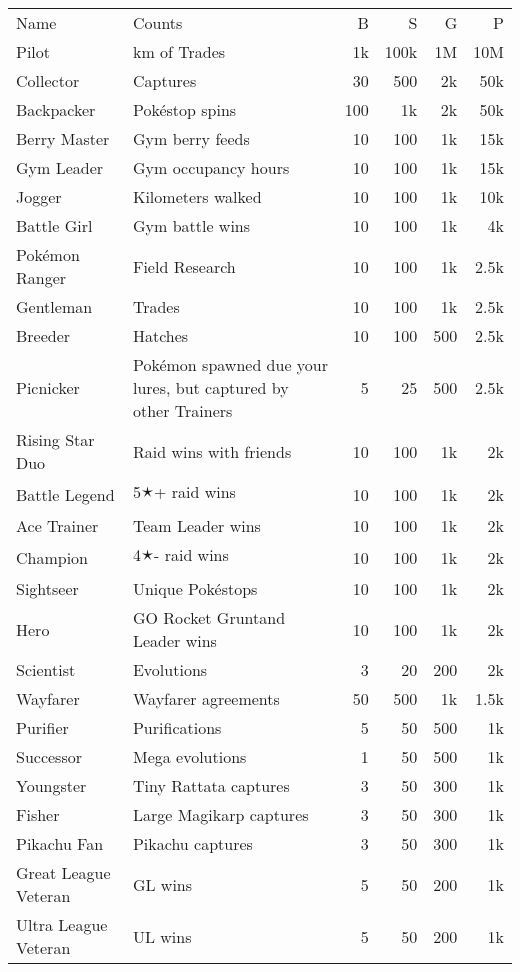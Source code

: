 \begin{longtable}{m{}m{}rrrr}
Name & Counts & B & S & G & P\\
\Midrule\endhead
Pilot & km of Trades & 1k & 100k & 1M & 10M\\
Collector & Captures & 30 & 500 & 2k & 50k\\
Backpacker & Pokéstop spins & 100 & 1k & 2k & 50k\\
Berry Master & Gym berry feeds & 10 & 100 & 1k & 15k\\
Gym Leader & Gym occupancy hours & 10 & 100 & 1k & 15k\\
Jogger & Kilometers walked & 10 & 100 & 1k & 10k\\
Battle Girl & Gym battle wins & 10 & 100 & 1k & 4k\\
Pokémon Ranger & Field Research & 10 & 100 & 1k & 2.5k\\
Gentleman & Trades & 10 & 100 & 1k & 2.5k\\
Breeder & Hatches & 10 & 100 & 500 & 2.5k\\
Picnicker & Pokémon spawned due your lures, but captured by other Trainers & 5 & 25 & 500 & 2.5k\\
Rising Star Duo & Raid wins with friends & 10 & 100 & 1k & 2k\\
Battle Legend & 5🟉+ raid wins & 10 & 100 & 1k & 2k\\
Ace Trainer & Team Leader wins & 10 & 100 & 1k & 2k\\
Champion & 4🟉- raid wins & 10 & 100 & 1k & 2k\\
Sightseer & Unique Pokéstops & 10 & 100 & 1k & 2k\\
Hero & GO Rocket Grunt\newline{}and Leader wins & 10 & 100 & 1k & 2k\\
Scientist & Evolutions & 3 & 20 & 200 & 2k\\
Wayfarer & Wayfarer agreements & 50 & 500 & 1k & 1.5k\\
Purifier & Purifications & 5 & 50 & 500 & 1k\\
Successor & Mega evolutions & 1 & 50 & 500 & 1k\\
Youngster & Tiny Rattata captures & 3 & 50 & 300 & 1k\\
Fisher & Large Magikarp captures & 3 & 50 & 300 & 1k\\
Pikachu Fan & Pikachu captures & 3 & 50 & 300 & 1k\\
Great League Veteran & GL wins & 5 & 50 & 200 & 1k\\
Ultra League Veteran & UL wins & 5 & 50 & 200 & 1k\\

\end{longtable}
